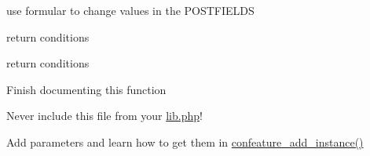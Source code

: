 
\begin{DoxyRefList}
\item[\label{todo__todo000005}%
\hypertarget{todo__todo000005}{}%
Global \hyperlink{locallib_8php_a7dc79dc02ce145c489edd4734a207278}{confeature\-\_\-api\-\_\-create} ()]use formular to change values in the P\-O\-S\-T\-F\-I\-E\-L\-D\-S  
\item[\label{todo__todo000003}%
\hypertarget{todo__todo000003}{}%
Global \hyperlink{locallib_8php_a0034931acefd021a0147a0216bc0a6a8}{confeature\-\_\-api\-\_\-login} ()]return conditions  
\item[\label{todo__todo000004}%
\hypertarget{todo__todo000004}{}%
Global \hyperlink{locallib_8php_a7acfa5bd6b3fa64681a044cfa5360652}{confeature\-\_\-api\-\_\-logout} ()]return conditions  
\item[\label{todo__todo000001}%
\hypertarget{todo__todo000001}{}%
Global \hyperlink{lib_8php_aef534dc463e45aa37218730f6ee5f4e1}{confeature\-\_\-cron} ()]Finish documenting this function  
\item[\label{todo__todo000002}%
\hypertarget{todo__todo000002}{}%
File \hyperlink{locallib_8php}{locallib.php} ]Never include this file from your \hyperlink{lib_8php}{lib.\-php}! 
\item[\label{todo__todo000006}%
\hypertarget{todo__todo000006}{}%
File \hyperlink{mod__form_8php}{mod\-\_\-form.php} ]Add parameters and learn how to get them in \hyperlink{lib_8php_a7e22c75c28ab3ae8b48c1d332f648fc5}{confeature\-\_\-add\-\_\-instance()} 
\end{DoxyRefList}